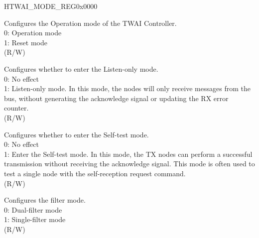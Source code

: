 \begin{register}{H}{TWAI\_MODE\_REG}{0x0000}\label{regdesc:TWAIMODEREG}
%
%
%
%
%
\regnewline%
\begin{regdesc}\begin{reglist}
\label{fielddesc:TWAIRESETMODE}\item [TWAI\_RESET\_MODE] Configures the Operation mode of the TWAI Controller. \\
0: Operation mode\\
1: Reset mode \\
(R/W)
\label{fielddesc:TWAILISTENONLYMODE}\item [TWAI\_LISTEN\_ONLY\_MODE] Configures whether to enter the Listen-only mode. \\
0: No effect\\
1: Listen-only mode. In this mode, the nodes will only receive messages from the bus, without generating the acknowledge signal or updating the RX error counter. \\
(R/W)
\label{fielddesc:TWAISELFTESTMODE}\item [TWAI\_SELF\_TEST\_MODE] Configures whether to enter the Self-test mode. \\
0: No effect\\
1: Enter the Self-test mode. In this mode, the TX nodes can perform a successful transmission without receiving the acknowledge signal. This mode is often used to test a single node with the self-reception request command. \\
(R/W)
\label{fielddesc:TWAIACCEPTANCEFILTERMODE}\item [TWAI\_ACCEPTANCE\_FILTER\_MODE] Configures the filter mode.\\
0: Dual-filter mode\\
1: Single-filter mode \\
(R/W)
\end{reglist}\end{regdesc}
\end{register}


